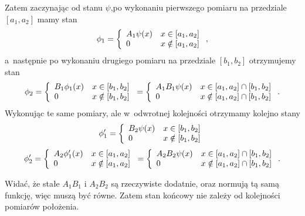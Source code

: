 \documentclass{article}
\begin{document}
\begin{enumerate}
Zatem zaczynając od stanu $\psi$,po wykonaniu pierwszego pomiaru 
na przedziale $[a_1,a_2]$ mamy stan
\[
\phi_1 = \left\{\begin{array}{l l}
	A_1\psi(x) & x \in [a_1,a_2]\\
	0 & x \notin [a_1,a_2]
\end{array}\right. \mathrm{,}
\]
a~następnie po wykonaniu drugiego pomiaru na przedziale $[b_1,b_2]$ otrzymujemy stan
\[
\phi_2 = \left\{\begin{array}{l l}
	B_1\phi_1(x) & x \in [b_1,b_2]\\
	0 & x \notin [b_1,b_2]
\end{array}\right. =
\left\{\begin{array}{l l}
	A_1B_1\psi(x) & x \in [a_1,a_2] \cap [b_1,b_2]\\
	0 & x \notin [a_1,a_2] \cap [b_1,b_2]
\end{array}\right. \mathrm{.}
\]
Wykonując te same pomiary, ale w~odwrotnej kolejności otrzymamy kolejno stany
\[
\phi_1' = \left\{\begin{array}{l l}
	B_2\psi(x) & x \in [b_1,b_2]\\
	0 & x \notin [b_1,b_2]
\end{array}\right.
\]
\[
\phi_2' = \left\{\begin{array}{l l}
	A_2\phi_1'(x) & x \in [a_1,a_2]\\
	0 & x \notin [a_1,a_2]
\end{array}\right. =
\left\{\begin{array}{l l}
	A_2B_2\psi(x) & x \in [a_1,a_2] \cap [b_1,b_2]\\
	0 & x \notin [a_1,a_2] \cap [b_1,b_2]
\end{array}\right. \mathrm{.}
\]

Widać, że stałe $A_1B_1$ i $A_2B_2$ są rzeczywiste dodatnie, oraz normują
tą samą funkcję, więc muszą być równe. Zatem stan końcowy nie zależy od kolejności
pomiarów położenia.

\end{enumerate}
\end{document}
